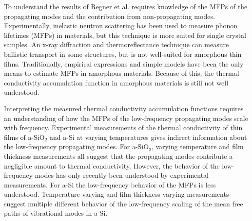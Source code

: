 \documentclass[aps,prb,onecolumn,preprint,superscriptaddress,footinbib,amsmath,amssymb,floatfix]{revtex4}
\begin{document}
To understand the results of Regner et al. requires knowledge of 
the MFPs of the 
propagating modes and the contribution from non-propagating modes. 
Experimentally, inelastic neutron scattering has been
used to measure phonon lifetimes (MFPs) in materials,
but this technique is more suited for single crystal samples.
\cite{christianson_phonon_2008} 
An x-ray diffraction and thermoreflectance technique
can measure ballistic transport in some structures, but is 
not well-suited for amorphous thin films.
\cite{highland_ballistic-phonon_2007} 
Traditionally, empirical expressions and
simple models have been the only means
to estimate MFPs in amorphous materials.
\cite{zeller_thermal_1971,graebner_phonon_1986,
freeman_thermal_1986,cahill_lattice_1988,cahill_heat_1989} 
Because of this, the thermal conductivity accumulation 
function in amorphous materials is still not well understood.
\cite{feldman_thermal_1993,cahill_thermal_1994,
feldman_numerical_1999,liu_high_2009,yang_anomalously_2010,
he_heat_2011,regner_broadband_2013}

Interpreting the measured thermal conductivity accumulation 
functions 
requires an understanding of how the MFPs of the 
low-frequency propagating modes scale with frequency.
\cite{freeman_thermal_1986,graebner_phonon_1986,
love_estimate_1990,feldman_thermal_1993,cahill_thermal_1994,
feldman_numerical_1999,baldi_thermal_2008,liu_high_2009,
yang_anomalously_2010} 
Experimental measurements of the thermal conductivity of
thin films of a-SiO$_2$ and a-Si at varying temperatures 
gives indirect information about the low-frequency propagating 
modes.\cite{freeman_thermal_1986,graebner_phonon_1986,
love_estimate_1990,feldman_thermal_1993,cahill_thermal_1994,
feldman_numerical_1999,zink_thermal_2006,baldi_thermal_2008,
liu_high_2009,yang_anomalously_2010,hondongwa_ultrasonic_2011} 
For a-SiO$_2$, varying temperature 
and film thickness
\cite{graebner_phonon_1986,freeman_thermal_1986,
cahill_lattice_1988,cahill_heat_1989,love_estimate_1990,
lee_heat_1997,yamane_measurement_2002,baldi_thermal_2008} 
measurements all suggest that the propagating modes 
contribute a negligible amount to thermal conductivity. 
However, the behavior of the low-frequency modes 
has only recently been understood by experimental 
measurements.
\cite{masciovecchio_evidence_2006,baldi_thermal_2008,
baldi_sound_2010,baldi_elastic_2011,baldi_emergence_2013} 
For a-Si the low-frequency behavior of the MFPs is less understood.
\cite{feldman_thermal_1993,cahill_thermal_1994,
feldman_numerical_1999,zink_thermal_2006,liu_high_2009,
yang_anomalously_2010,he_heat_2011,hondongwa_ultrasonic_2011} 
Temperature-varying\cite{zink_thermal_2006} 
and film thickness-varying measurements
\cite{pompe_thermal_1988,cahill_thermal_1989,hasselman_thermal_1989,
kuo_thermal_1992,feldman_thermal_1993,cahill_thermal_1994,
wada_thermal_1996,feldman_numerical_1999,
moon_thermal_2002,zink_thermal_2006,zink_excess_2006,liu_high_2009,
yang_anomalously_2010}
suggest multiple different behavior of the low-frequency 
scaling of the mean free paths of vibrational modes in a-Si. 
\end{document}
